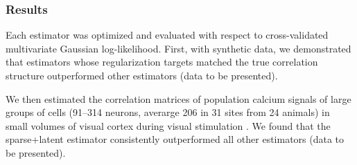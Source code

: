 \documentclass[12pt]{amsart}
\begin{document}
\subsubsection*{Results}
Each estimator was optimized and evaluated with respect to cross-validated multivariate Gaussian log-likelihood.  First, with synthetic data, we demonstrated that estimators whose regularization targets matched the true correlation structure outperformed other estimators (data to be presented).  

We then estimated the correlation matrices of population calcium signals of large groups of cells (91--314 neurons, averarge 206 in 31 sites from 24 animals) in small volumes of visual cortex during visual stimulation \cite{Cotton:2013}. We found that the sparse+latent estimator consistently outperformed all other estimators (data to be presented).
\end{document}

